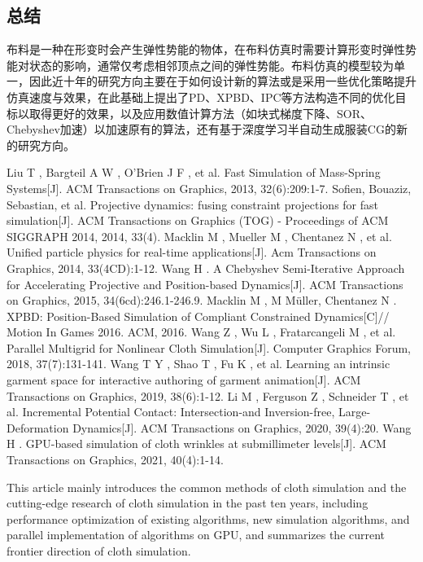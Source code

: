 \documentclass{CLGPY}
\begin{document}
\begin{multicols}{2}
		\section{总结}
		布料是一种在形变时会产生弹性势能的物体，在布料仿真时需要计算形变时弹性势能对状态的影响，通常仅考虑相邻顶点之间的弹性势能。布料仿真的模型较为单一，因此近十年的研究方向主要在于如何设计新的算法或是采用一些优化策略提升仿真速度与效果，在此基础上提出了PD、XPBD、IPC等方法构造不同的优化目标以取得更好的效果，以及应用数值计算方法（如块式梯度下降、SOR、Chebyshev加速）以加速原有的算法，还有基于深度学习半自动生成服装CG的新的研究方向。

		\begin{thebibliography}{8}
			Liu T ,  Bargteil A W ,  O'Brien J F , et al. Fast Simulation of Mass-Spring Systems[J]. ACM Transactions on Graphics, 2013, 32(6):209:1-7.
			Sofien, Bouaziz, Sebastian, et al. Projective dynamics: fusing constraint projections for fast simulation[J]. ACM Transactions on Graphics (TOG) - Proceedings of ACM SIGGRAPH 2014, 2014, 33(4).
			Macklin M ,  Mueller M ,  Chentanez N , et al. Unified particle physics for real-time applications[J]. Acm Transactions on Graphics, 2014, 33(4CD):1-12.
			Wang H . A Chebyshev Semi-Iterative Approach for Accelerating Projective and Position-based Dynamics[J]. ACM Transactions on Graphics, 2015, 34(6cd):246.1-246.9.
			Macklin M , M Müller,  Chentanez N . XPBD: Position-Based Simulation of Compliant Constrained Dynamics[C]// Motion In Games 2016. ACM, 2016.
			Wang Z ,  Wu L ,  Fratarcangeli M , et al. Parallel Multigrid for Nonlinear Cloth Simulation[J]. Computer Graphics Forum, 2018, 37(7):131-141.
			Wang T Y ,  Shao T ,  Fu K , et al. Learning an intrinsic garment space for interactive authoring of garment animation[J]. ACM Transactions on Graphics, 2019, 38(6):1-12.
			Li M ,  Ferguson Z ,  Schneider T , et al. Incremental Potential Contact: Intersection-and Inversion-free, Large-Deformation Dynamics[J]. ACM Transactions on Graphics, 2020, 39(4):20.
			Wang H . GPU-based simulation of cloth wrinkles at submillimeter levels[J]. ACM Transactions on Graphics, 2021, 40(4):1-14.
		\end{thebibliography}
    \end{multicols}%

\Maketitle
\begin{enabstract}
	This article mainly introduces the common methods of cloth simulation and the cutting-edge research of cloth simulation in the past ten years, including performance optimization of existing algorithms, new simulation algorithms, and parallel implementation of algorithms on GPU, and summarizes the current frontier direction of cloth simulation.

\end{enabstract}
\end{document}
